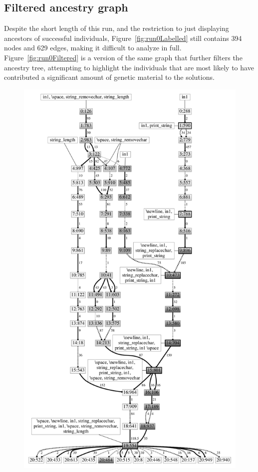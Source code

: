 \subsection{Filtered ancestry graph}

Despite the short length of this run, and the restriction to just displaying
ancestors of successful individuals, Figure~\ref{fig:run0Labelled} still
contains 394 nodes and 629 edges, making it difficult to analyze in full.
Figure~\ref{fig:run0Filtered} is a version of the same graph that further
filters the ancestry tree, attempting to highlight the individuals that
are most likely to have contributed a significant amount of genetic material
to the solutions.

\begin{figure}[tb!p] %
	\begin{center}
		\includegraphics[height=\textheight]{../figures/filtered_fill}

\end{center}
\end{figure}

